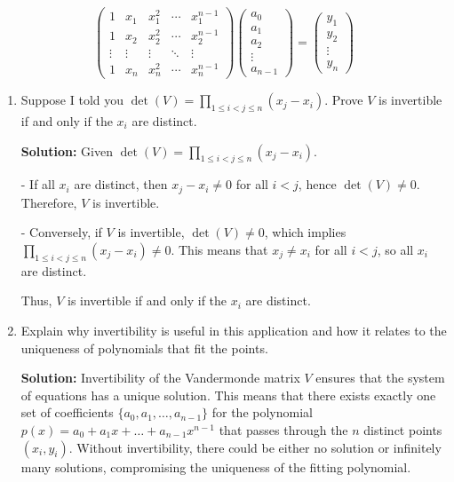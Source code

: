 \documentclass[12pt]{article}
\newcommand{\qspace}{\vspace{1em}} %
\newenvironment{solution}{\noindent\textbf{Solution:} }{\qspace}
\begin{document}
\begin{enumerate}
    $$\begin{pmatrix}
1 & x_1 & x_1^2 & \cdots & x_1^{n-1} \\
1 & x_2 & x_2^2 & \cdots & x_2^{n-1} \\
\vdots & \vdots & \vdots & \ddots & \vdots \\
1 & x_n & x_n^2 & \cdots & x_n^{n-1}
\end{pmatrix}
\begin{pmatrix}
a_0 \\
a_1 \\
a_2 \\
\vdots \\
a_{n-1}
\end{pmatrix}
=
\begin{pmatrix}
y_1 \\
y_2 \\
\vdots \\
y_n
\end{pmatrix}$$
    \begin{enumerate}
        \item 
    
    Suppose I told you $\det(V) = \prod_{1 \leq i  < j \leq n} (x_j - x_i)$. Prove $V$ is invertible if and only if the $x_i$ are distinct.
    
    \begin{solution}
    Given \( \det(V) = \prod_{1 \leq i < j \leq n} (x_j - x_i) \).

    - If all \( x_i \) are distinct, then \( x_j - x_i \neq 0 \) for all \( i < j \), hence \( \det(V) \neq 0 \). Therefore, \( V \) is invertible.

    - Conversely, if \( V \) is invertible, \( \det(V) \neq 0 \), which implies \( \prod_{1 \leq i < j \leq n} (x_j - x_i) \neq 0 \). This means that \( x_j \neq x_i \) for all \( i < j \), so all \( x_i \) are distinct.

    Thus, \( V \) is invertible if and only if the \( x_i \) are distinct.
    \end{solution}
    
    \item Explain why invertibility is useful in this application and how it relates to the uniqueness of polynomials that fit the points.
    
        \begin{solution}
        Invertibility of the Vandermonde matrix \( V \) ensures that the system of equations has a unique solution. This means that there exists exactly one set of coefficients \( \{a_0, a_1, \dots, a_{n-1}\} \) for the polynomial \( p(x) = a_0 + a_1 x + \dots + a_{n-1}x^{n-1} \) that passes through the \( n \) distinct points \( (x_i, y_i) \). Without invertibility, there could be either no solution or infinitely many solutions, compromising the uniqueness of the fitting polynomial.
        \end{solution}
    \end{enumerate}
    

\end{enumerate}
\end{document}
